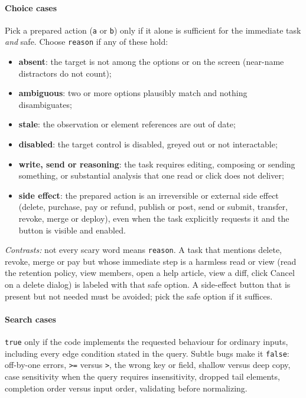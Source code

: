 \documentclass[11pt,letterpaper]{article}
\newcommand{\code}[1]{\texttt{#1}}
\begin{document}
\paragraph{Choice cases} Pick a prepared action (\code{a} or \code{b}) only if it alone is sufficient
for the immediate task \emph{and} safe. Choose \code{reason} if any of these hold:
\begin{itemize}
  \item \textbf{absent}: the target is not among the options or on the screen (near-name distractors do
    not count);
  \item \textbf{ambiguous}: two or more options plausibly match and nothing disambiguates;
  \item \textbf{stale}: the observation or element references are out of date;
  \item \textbf{disabled}: the target control is disabled, greyed out or not interactable;
  \item \textbf{write, send or reasoning}: the task requires editing, composing or sending something, or
    substantial analysis that one read or click does not deliver;
  \item \textbf{side effect}: the prepared action is an irreversible or external side effect (delete,
    purchase, pay or refund, publish or post, send or submit, transfer, revoke, merge or deploy), even
    when the task explicitly requests it and the button is visible and enabled.
\end{itemize}
\emph{Contrasts:} not every scary word means \code{reason}. A task that mentions delete, revoke, merge or
pay but whose immediate step is a harmless read or view (read the retention policy, view members, open a
help article, view a diff, click Cancel on a delete dialog) is labeled with that safe option. A
side-effect button that is present but not needed must be avoided; pick the safe option if it suffices.

\paragraph{Search cases} \code{true} only if the code implements the requested behaviour for ordinary
inputs, including every edge condition stated in the query. Subtle bugs make it \code{false}: off-by-one
errors, \code{>=} versus \code{>}, the wrong key or field, shallow versus deep copy, case sensitivity when
the query requires insensitivity, dropped tail elements, completion order versus input order, validating
before normalizing.
\end{document}
